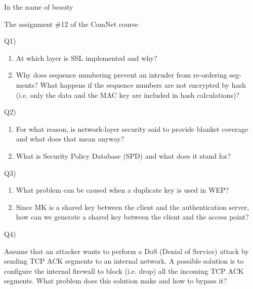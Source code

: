 \documentclass[10pt,letterpaper]{article}
\begin{document}
\Large
\begin{center}
In the name of beauty

The assignment \#12 of the ComNet course

\hrulefill
\end{center}


Q1) 

\begin{enumerate}[label=\alph*)]
\item
At which layer is SSL implemented and why?
\item
Why does sequence numbering prevent an intruder from re-ordering seg-
ments? What happens if the sequence numbers are not encrypted by hash
(i.e. only the data and the MAC key are included in hash calculations)?
\end{enumerate}

Q2)

\begin{enumerate}[label=\alph*)]
\item
For what reason, is network-layer security said to provide blanket coverage and what does that mean anyway?
\item
What is Security Policy Database (SPD) and what does it stand for?
\end{enumerate}

Q3)

\begin{enumerate}[label=\alph*)]
\item
What problem can be caused when a duplicate key is used in WEP?
\item
Since MK is a shared key between the client and the authentication server, how can we generate a shared key between the client and the access point?
\end{enumerate}

Q4)

Assume that an attacker wants to perform a DoS (Denial of Service) attack by sending TCP ACK segments to an internal network. A possible solution is to configure the internal firewall to block (i.e. drop) all the incoming TCP ACK segments. What problem does this solution make and how to bypass it?
\end{document}
